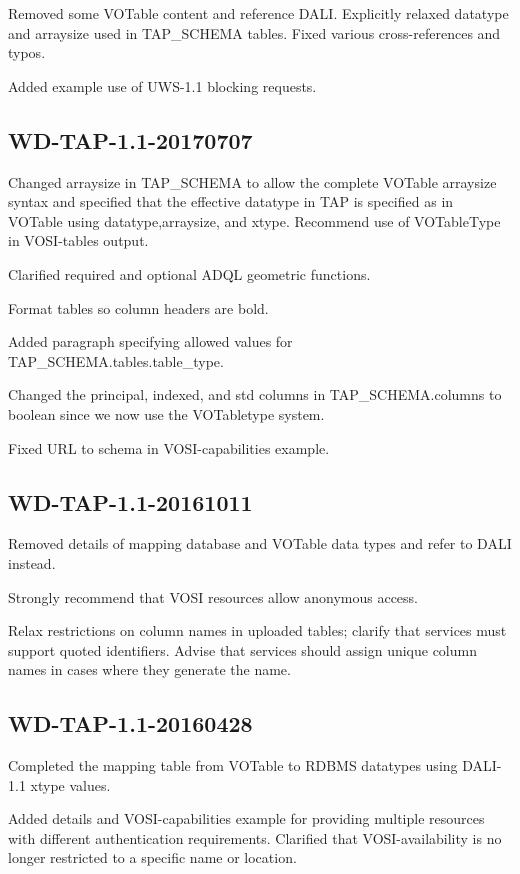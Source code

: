 \documentclass[11pt,letter]{ivoa}
\newcommand{\tapschema}{TAP\_SCHEMA}
\newcommand{\tapschema}{\mbox{%
  \relsize{-0.5}TAP\discretionary{-}{}{\kern-2pt\_}SCHEMA}}
\begin{document}
Removed some VOTable content and reference DALI. Explicitly relaxed datatype and arraysize used in \tapschema{} tables. Fixed various cross-references and typos. 

Added example use of UWS-1.1 blocking requests.

\subsection{WD-TAP-1.1-20170707}

Changed arraysize in \tapschema{} to allow the complete VOTable arraysize syntax and specified that the effective datatype in TAP is specified as in VOTable using datatype,arraysize, and xtype. Recommend use of VOTableType in VOSI-tables output.

Clarified required and optional ADQL geometric functions.

Format tables so column headers are bold.

Added paragraph specifying allowed values for \tapschema.tables.table\_type.

Changed the principal, indexed, and std columns in \tapschema.columns to boolean since we
now use the VOTabletype system.

Fixed URL to schema in VOSI-capabilities example.

\subsection{WD-TAP-1.1-20161011}

Removed details of mapping database and VOTable data types and refer to DALI 
instead. 

Strongly recommend that VOSI resources allow anonymous access.

Relax restrictions on column names in uploaded tables; clarify that services 
must support quoted identifiers. Advise that services should assign unique 
column names in cases where they generate the name.

\subsection{WD-TAP-1.1-20160428}

Completed the mapping table from VOTable to RDBMS datatypes using DALI-1.1 xtype values.

Added details and VOSI-capabilities example for providing multiple resources with different 
authentication requirements. Clarified that VOSI-availability is no longer restricted to a
specific name or location.
\end{document}
